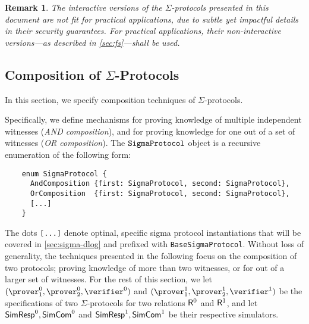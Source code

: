 \documentclass[runningheads,11pt]{article}
\newtheorem{remark}{Remark}
\begin{document}
\begin{remark}
  The interactive versions of the $\Sigma$-protocols presented in this document are not fit for practical applications, due to subtle yet impactful details in their security guarantees.
 For practical applications, their non-interactive versions---as described in \cref{sec:fs}---shall be used.
\end{remark}


\subsection{Composition of $\Sigma$-Protocols}
\label{sec:composition}
\label{sec:or-comp}
\label{sec:and-comp}
  In this section, we specify composition techniques of $\Sigma$-protocols.

  Specifically, we define mechanisms for proving knowledge of multiple independent witnesses (\emph{AND composition}), and for proving knowledge for one out of a set of witnesses (\emph{OR composition}). The $\texttt{SigmaProtocol}$ object is a recursive enumeration of the following form:

  \begin{verbatim}
    enum SigmaProtocol {
      AndComposition {first: SigmaProtocol, second: SigmaProtocol},
      OrComposition  {first: SigmaProtocol, second: SigmaProtocol},
      [...]
    }
  \end{verbatim}

The dots \texttt{[...]} denote optinal, specific sigma protocol instantiations that will be covered in \cref{sec:sigma-dlog} and prefixed with \texttt{BaseSigmaProtocol}.
  Without loss of generality, the techniques presented in the following focus on the composition of two protocols;
  proving knowledge of more than two witnesses, or for out of a larger set of witnesses.
  For the rest of this section, we let $(\prover_1^0,\prover_2^0,\verifier^0)$ and $(\prover_1^1,\prover_2^1,\verifier^1)$ be the specifications of two $\Sigma$-protocols for two relations $\mathsf{R}^0$ and $\mathsf{R}^1$, and let $\textsf{SimResp}^0,\textsf{SimCom}^0$ and $\textsf{SimResp}^1,\textsf{SimCom}^1$ be their respective simulators.
\end{document}
